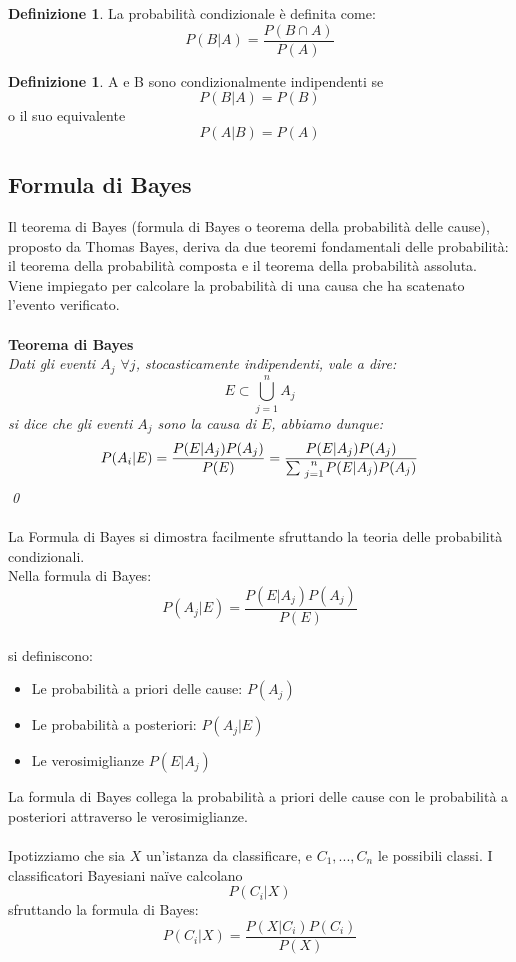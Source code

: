 \documentclass{article}
\theoremstyle{plain}
\theoremstyle{definition}
\newtheorem{defn}[]{Definizione} %
\begin{document}
\begin{defn}
	La probabilità condizionale è definita come: $$P(B|A)=\frac{P(B \cap A)}{P(A)}$$
\end{defn}
\begin{defn}
	A e B sono condizionalmente indipendenti se $$P(B|A)=P(B)$$ o il suo equivalente $$P(A|B)=P(A)$$
\end{defn}
\subsection{Formula di Bayes}
Il teorema di Bayes (formula di Bayes o teorema della probabilità delle cause), proposto da Thomas Bayes, deriva da due teoremi fondamentali delle probabilità: il teorema della probabilità composta e il teorema della probabilità assoluta. Viene impiegato per calcolare la probabilità di una causa che ha scatenato l'evento verificato.
\\
\\
\textbf{Teorema di Bayes}
\\
\textit{
Dati gli eventi $A_j$ $\forall j$, stocasticamente indipendenti, vale a dire:
$$E \subset \bigcup\limits_{j=1}^{n} A_j $$
si dice che gli eventi $A_j$ sono la causa di $E$,  abbiamo dunque:
$$
P(A_{i}|E)={\frac  {P(E|A_{j})P(A_{j})}{P(E)}}={\frac  {P(E|A_{j})P(A_{j})}{\sum {n \atop j=1}P(E|A_{j})P(A_{j})}}$$
\qed
}
\\
\\
La Formula di Bayes si dimostra facilmente sfruttando la teoria delle probabilità condizionali. 
\footnotemark
{}
\\
Nella formula di Bayes:
$$P(A_{j}|E)={\frac  {P(E|A_{j})P(A_{j})}{P(E)}}$$
\\
si definiscono:
\begin{itemize}
\item Le probabilità a priori delle cause: $P(A_j)$
\item Le probabilità a posteriori: $P(A_j|E)$
\item Le verosimiglianze $P(E|A_{j})$
\end{itemize} 
La formula di Bayes collega la probabilità a priori delle cause con le probabilità a posteriori attraverso le verosimiglianze.
\\
\\
Ipotizziamo che sia $X$ un'istanza da classificare, e $C_1,...,C_n$ le possibili classi. I classificatori Bayesiani naïve calcolano $$P(C_i|X)$$ sfruttando la formula di Bayes: $$P(C_i|X)=\frac{P(X|C_i)P(C_i)}{P(X)}$$
\end{document}

